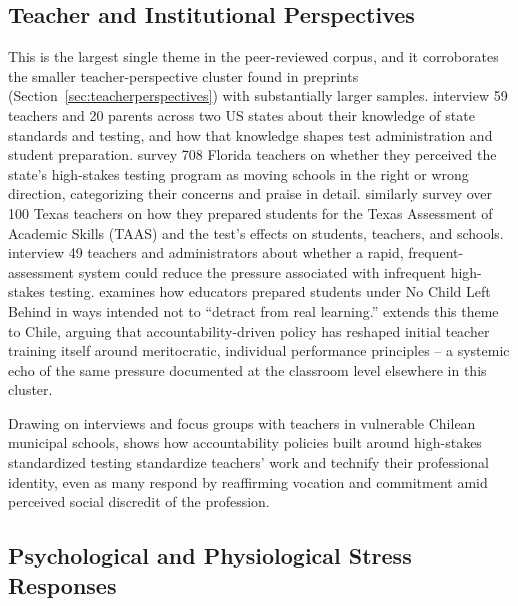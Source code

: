 \documentclass[11pt]{article}
\begin{document}
\subsection{Teacher and Institutional Perspectives}

This is the largest single theme in the peer-reviewed corpus, and it corroborates the smaller teacher-perspective cluster found in preprints (Section~\ref{sec:teacherperspectives}) with substantially larger samples. \citet{barksdale2000stakes} interview 59 teachers and 20 parents across two US states about their knowledge of state standards and testing, and how that knowledge shapes test administration and student preparation. \citet{jones2004voices} survey 708 Florida teachers on whether they perceived the state's high-stakes testing program as moving schools in the right or wrong direction, categorizing their concerns and praise in detail. \citet{gordon1997price} similarly survey over 100 Texas teachers on how they prepared students for the Texas Assessment of Academic Skills (TAAS) and the test's effects on students, teachers, and schools. \citet{yeh2006rapid} interview 49 teachers and administrators about whether a rapid, frequent-assessment system could reduce the pressure associated with infrequent high-stakes testing. \citet{gulek2003preparing} examines how educators prepared students under No Child Left Behind in ways intended not to ``detract from real learning.'' \citet{carrasco2019formacion} extends this theme to Chile, arguing that accountability-driven policy has reshaped initial teacher training itself around meritocratic, individual performance principles -- a systemic echo of the same pressure documented at the classroom level elsewhere in this cluster.

Drawing on interviews and focus groups with teachers in vulnerable Chilean municipal schools, \citet{carrasco2019identidad} shows how accountability policies built around high-stakes standardized testing standardize teachers' work and technify their professional identity, even as many respond by reaffirming vocation and commitment amid perceived social discredit of the profession.

\subsection{Psychological and Physiological Stress Responses}
\end{document}

